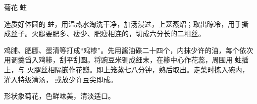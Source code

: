 \begin{recipe}{菊花𧎼蛀}

\ingredients


\preparation

\step 选质好体圆的𧎼蛀，用温热水淘洗干净，加汤浸过，上笼蒸炤；取出晾冷，用手撕
成丝子。火腿要肥多、瘦少、肥痩相连的，切成六分长的二粗丝。

\step 鸡脯、肥膘、蛋清等打成“鸡糁”。先用酱油碟二十四个，内抹少许的油，每个依次
用调羹舀入鸡糁，刮平刮圆。将豌豆米铡成细末，在糁中心作花蕊，周围用𧎼蛀插上，与
火腿丝相隔嵌作花瓣。即上笼蒸七八分钟，熟后取出。走菜时拣入碗内，灌入特级清汤，
或放少许豆尖即成。

\features

形状象菊花，色鲜味美，清淡适口。

\end{recipe}

